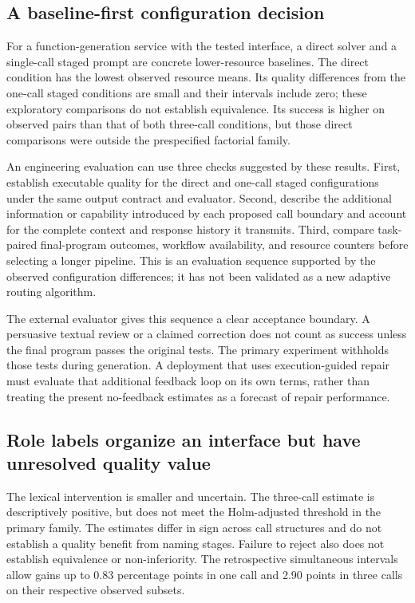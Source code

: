 \subsection{A baseline-first configuration decision}
For a function-generation service with the tested interface, a direct solver and a single-call staged prompt are concrete lower-resource baselines. The direct condition has the lowest observed resource means. Its quality differences from the one-call staged conditions are small and their intervals include zero; these exploratory comparisons do not establish equivalence. Its success is higher on observed pairs than that of both three-call conditions, but those direct comparisons were outside the prespecified factorial family.

An engineering evaluation can use three checks suggested by these results. First, establish executable quality for the direct and one-call staged configurations under the same output contract and evaluator. Second, describe the additional information or capability introduced by each proposed call boundary and account for the complete context and response history it transmits. Third, compare task-paired final-program outcomes, workflow availability, and resource counters before selecting a longer pipeline. This is an evaluation sequence supported by the observed configuration differences; it has not been validated as a new adaptive routing algorithm.

The external evaluator gives this sequence a clear acceptance boundary. A persuasive textual review or a claimed correction does not count as success unless the final program passes the original tests. The primary experiment withholds those tests during generation. A deployment that uses execution-guided repair must evaluate that additional feedback loop on its own terms, rather than treating the present no-feedback estimates as a forecast of repair performance.

\subsection{Role labels organize an interface but have unresolved quality value}
The lexical intervention is smaller and uncertain. The three-call estimate is descriptively positive, but does not meet the Holm-adjusted threshold in the primary family. The estimates differ in sign across call structures and do not establish a quality benefit from naming stages. Failure to reject also does not establish equivalence or non-inferiority. The retrospective simultaneous intervals allow gains up to 0.83 percentage points in one call and 2.90 points in three calls on their respective observed subsets.


